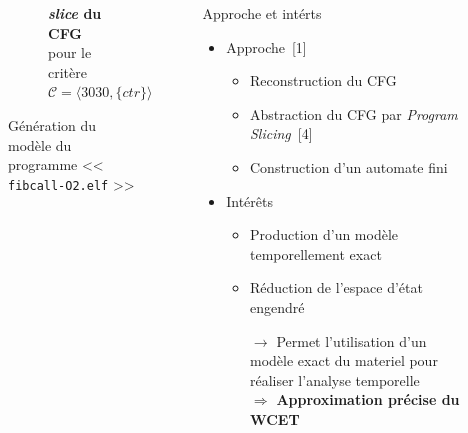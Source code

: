\documentclass[final]{beamer}
\begin{document}
\begin{frame}
\begin{columns}[t]
\begin{column}{.594\linewidth}
\begin{figure}[ht]
\begin{subfigure}{.30\textwidth}
            \captionsetup{justification=centering}
            \caption{\textbf{\emph{slice} du CFG} pour le critère \\
              $\mathcal{C} = \langle 3030, \{ ctr \} \rangle$}
            \label{fig:slice2}
          \end{subfigure}
          \caption{Génération du modèle du programme << \texttt{fibcall-O2.elf} >>}
        \end{figure}
      \end{column}
      \begin{column}{.297\linewidth}
        \begin{block}{Approche et intérts}
          \begin{itemize}
            \item Approche~{\color{skyblue2}[1]}
              \begin{itemize}
                \item Reconstruction du CFG
                \item Abstraction du CFG par \emph{Program Slicing}~{\color{skyblue2}[4]}
                \item Construction d'un automate fini
              \end{itemize}
              \vspace{.5em}
          
              \item Intérêts
                \begin{itemize}
                  \item Production d'un modèle temporellement exact
                  \item Réduction de l'espace d'état engendré \\
                    \begin{center}
                      $\rightarrow$ Permet l'utilisation d'un modèle exact du materiel pour réaliser l'analyse temporelle \\
                      \vspace{.5em}
                      $\Rightarrow$ \textbf{Approximation précise du WCET}
                    \end{center}
                \end{itemize}
          \end{itemize}
        \end{block}
      \end{column}
    \end{columns}
    

\end{frame}
\end{document}
